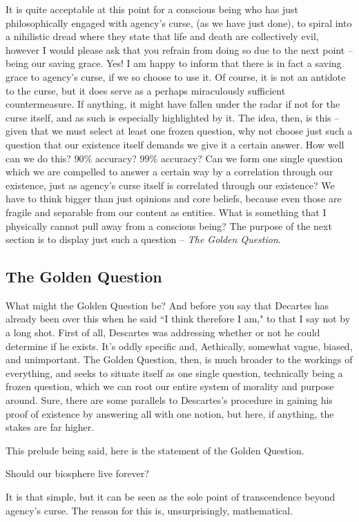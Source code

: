 It is quite acceptable at this point for a conscious being who has just philosophically engaged with agency's curse, (as we have just done), to spiral into a nihilistic dread where they state that life and death are collectively evil, however I would please ask that you refrain from doing so due to the next point -- being our saving grace. Yes! I am happy to inform that there is in fact a saving grace to agency's curse, if we so choose to use it. Of course, it is not an antidote to the curse, but it does serve as a perhaps miraculously sufficient countermeasure. If anything, it might have fallen under the radar if not for the curse itself, and as such is especially highlighted by it. The idea, then, is this -- given that we must select at least one frozen question, why not choose just such a question that our existence itself demands we give it a certain answer. How well can we do this? $90\%$ accuracy? $99\%$ accuracy? Can we form one single question which we are compelled to answer a certain way by a correlation through our existence, just as agency's curse itself is correlated through our existence? We have to think bigger than just opinions and core beliefs, because even those are fragile and separable from our content as entities. What is something that I physically cannot pull away from a conscious being? The purpose of the next section is to display just such a question -- \textit{The Golden Question}.

\subsection{The Golden Question}

What might the Golden Question be? And before you say that Decartes has already been over this when he said ``I think therefore I am," to that I say not by a long shot. First of all, Descartes was addressing whether or not he could determine if he exists. It's oddly specific and, Aethically, somewhat vague, biased, and unimportant. The Golden Question, then, is much broader to the workings of everything, and seeks to situate itself as one single question, technically being a frozen question, which we can root our entire system of morality and purpose around. Sure, there are some parallels to Descartes's procedure in gaining his proof of existence by answering all with one notion, but here, if anything, the stakes are far higher. 

This prelude being said, here is the statement of the Golden Question.
\begin{frozen}
Should our biosphere live forever?
\end{frozen}
It is that simple, but it can be seen as the sole point of transcendence beyond agency's curse. The reason for this is, unsurprisingly, mathematical. 

